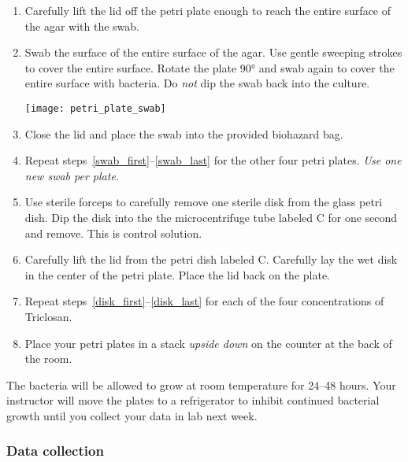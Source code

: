 \documentclass[12pt]{exam}
\begin{document}
\begin{questions}
\begin{enumerate}
		\item Carefully lift the lid off the petri plate enough to reach the entire surface of the agar with the swab.
		
		\item Swab the surface of the entire surface of the agar. Use gentle sweeping strokes to cover the entire surface. Rotate the plate 90° and swab again to cover the entire surface with bacteria. Do \emph{not} dip the swab back into the culture.
		
		{\centering\texttt{[image: petri\_plate\_swab]}\par
		}
		
		\item \label{swab_last} Close the lid and place the swab into the provided biohazard bag.
		
		\item Repeat steps~\ref{swab_first}–\ref{swab_last} for the other four petri plates. \emph{Use one new swab per plate.}
		
		\item \label{disk_first} Use sterile forceps to carefully remove one sterile disk from the glass petri dish. Dip the disk into the the microcentrifuge tube labeled C for one second and remove. This is control solution.
		
		\item \label{disk_last} Carefully lift the lid from the petri dish labeled C. Carefully lay the wet disk in the center of the petri plate. Place the lid back on the plate.


		\item Repeat steps~\ref{disk_first}–\ref{disk_last} for each of the four concentrations of Triclosan.
		
		\item Place your petri plates in a stack \emph{upside down} on the counter at the back of the room.
		
	\end{enumerate}

The bacteria will be allowed to grow at room temperature for 24–48 hours. Your instructor will move the plates to a refrigerator to inhibit continued bacterial growth until you collect your data in lab next week.

\subsubsection*{Data collection}


\end{questions}
\end{document}
